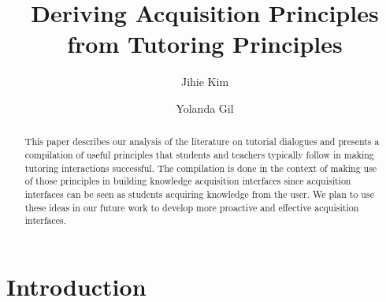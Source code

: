 \documentclass{llncs}
\begin{document}
\pagestyle{empty}

\mainmatter

\title{Deriving Acquisition Principles\\ from Tutoring Principles
}


\author{Jihie Kim \and Yolanda Gil
}




\maketitle

\begin{abstract}
This paper describes our analysis of the literature on tutorial dialogues and
presents a compilation of useful principles that students and teachers
typically follow
in making tutoring interactions successful.  The compilation is done in the
context of making use of those principles in building knowledge acquisition
interfaces since acquisition interfaces can be seen as students acquiring
knowledge from the user.  We plan to use these ideas in our future work to
develop more proactive and effective acquisition interfaces.

\end{abstract}


\section{Introduction}
\end{document}
